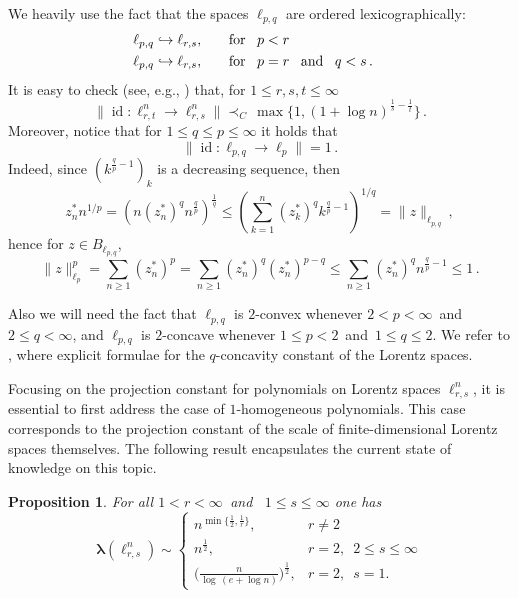 \documentclass[12pt]{amsart}
\numberwithin{subsection}{section}
\newtheorem{proposition}[theorem]{Proposition}
\theoremstyle{definition}
\theoremstyle{remark}
\DeclareMathOperator{\id}{\mathrm{id}}
\begin{document}
We heavily use the fact that the spaces $\ell_{p,q}$ are ordered lexicographically:
\begin{align*}
&
\ell_{p,q} \hookrightarrow \ell_{r, s},  \quad\,\,\,\,\, \text{for \, $p < r$} \\
&
\ell_{p, q} \hookrightarrow \ell_{r, s}, \quad\,\,\,\,\, \text{for \, $p=r$ \, and \, $q < s$\,.}
&
\end{align*}
It is easy to check (see, e.g., \cite[Lemma 22]{defant2006norms}) that, for $1 \leq r,s,t \leq \infty$
\begin{equation}\label{eq: norm identity lorentz}
\big\|{\id} \colon \ell_{r,t}^n \to \ell_{r,s}^n\big\| \prec_C\, \max\big\{1,(1 + \log n)^{\frac{1}{s}-\frac{1}{t}}\big\}\,.
\end{equation}
Moreover, notice that for $1 \le q \leq p \le \infty $ it holds that
\begin{equation}\label{eq: norma id lorentz q < p}
\|\id \colon \ell_{p,q} \to \ell_p \| = 1\,.
\end{equation}
Indeed, since $(k^{\frac{q}{p}-1})_k$ is a decreasing sequence, then
\[
z_n^* n^{1/p} = \left(n(z_n^*)^qn^{\frac{q}{p}}\right)^{\frac1{q}}
\le \left( \sum_{k=1}^n (z_k^*)^q k^{\frac{q}{p}-1} \right)^{1/q} = \| z  \|_{\ell_{p,q}}\,,
\]
hence for $z \in B_{\ell_{p,q}}$,
\[
\|z\|_{\ell_p}^p = \sum_{n \ge 1} (z_n^*)^p = \sum_{n \ge 1} (z_n^*)^q (z_n^*)^{p-q}
\le \sum_{n \ge 1} (z_n^*)^q n^{\frac{q}{p}-1} \le 1\,.
\]

Also we will need the fact that $\ell_{p, q}$ is $2$-convex whenever $2 <p < \infty$ \,and \, $2 \leq q < \infty$, and
$\ell_{p, q}$ is $2$-concave whenever $1 \leq p < 2$ \,and \,$1 \leq q \leq 2$. We refer to \cite{Jameson}, where explicit
formulae for the $q$-concavity constant of the Lorentz spaces.

Focusing on the projection constant for polynomials on Lorentz spaces $\ell_{r,s}^n$, it is essential to first address the case of $1$-homogeneous polynomials. This case corresponds to the projection constant of the scale of finite-dimensional Lorentz spaces themselves. The following result encapsulates the current state of knowledge on this topic.


\begin{proposition} \label{lor}
For all $1 < r < \infty$ \,and \, $1 \leq s \leq \infty$ one has
\[
\boldsymbol{\lambda}(\ell^n_{r,s})\sim
\begin{cases}
n^{\min\big\{\frac{1}{2}, \frac{1}{r} \big\}},  & r \neq 2\\[2mm]
n^{\frac{1}{2}},&  r = 2, \, \, \, 2 \leq s \leq \infty \\[2mm]
\Big({\frac{n}{\log \,(e + \log n)}}\Big)^{\frac12},&  r = 2, \, \,\,s=1.
\end{cases}
\]
\end{proposition}
\end{document}
